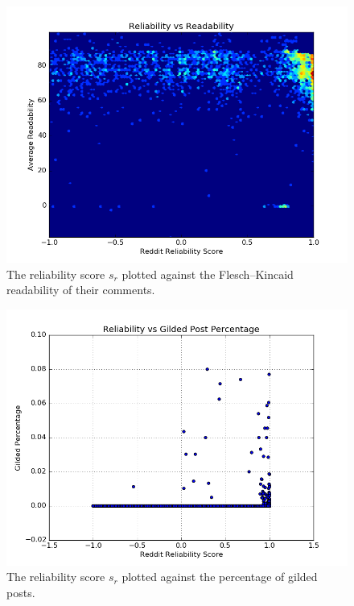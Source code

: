 \begin{figure}[tb]
    \centering
    \includegraphics[width=\linewidth]{../src/do_regression/figs/reliability_readability.png}
    \caption{The reliability score $s_r$ plotted against the Flesch--Kincaid readability of their comments.}
    \label{fig:reliability_readability}
\end{figure}

\begin{figure}[tb]
    \centering
    \includegraphics[width=\linewidth]{../src/do_regression/figs/reliability_gilded.png}
    \caption{The reliability score $s_r$ plotted against the percentage of gilded posts.}
    \label{fig:reliability_gilded}
\end{figure}


